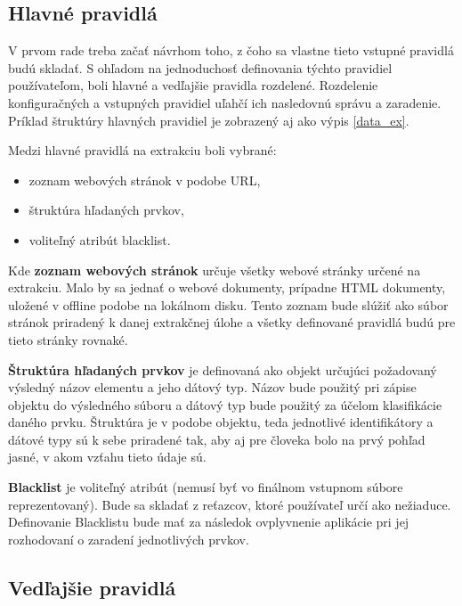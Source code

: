 \bigskip

\subsection{Hlavné pravidlá}

V prvom rade treba začať návrhom toho, z čoho sa vlastne tieto vstupné pravidlá budú skladať. S ohľadom na jednoduchosť definovania týchto pravidiel používateľom, boli hlavné a vedľajšie pravidla rozdelené. Rozdelenie konfiguračných a vstupných pravidiel uľahčí ich nasledovnú správu a zaradenie. Príklad štruktúry hlavných pravidiel je zobrazený aj ako výpis \ref{data_ex}.

Medzi hlavné pravidlá na extrakciu boli vybrané:
\begin{itemize}
    \item zoznam webových stránok v podobe URL,
    \item štruktúra hľadaných prvkov,
    \item voliteľný atribút blacklist.
\end{itemize}

\bigskip

Kde \textbf{zoznam webových stránok} určuje všetky webové stránky určené na extrakciu. Malo by sa jednať o webové dokumenty, prípadne HTML dokumenty, uložené v offline podobe na lokálnom disku. Tento zoznam bude slúžiť ako súbor stránok priradený k danej extrakčnej úlohe a všetky definované pravidlá budú pre tieto stránky rovnaké. 

\bigskip

\textbf{Štruktúra hľadaných prvkov} je definovaná ako objekt určujúci požadovaný výsledný názov elementu a jeho  dátový typ. Názov bude použitý pri zápise objektu do výsledného súboru a dátový typ bude použitý za účelom klasifikácie daného prvku. Štruktúra je v podobe objektu, teda jednotlivé identifikátory a dátové typy sú k sebe priradené tak, aby aj pre človeka bolo na prvý pohľad jasné, v akom vzťahu tieto údaje sú.

\bigskip

\textbf{Blacklist} je voliteľný atribút (nemusí byť vo finálnom vstupnom súbore reprezentovaný). Bude sa skladať z reťazcov, ktoré používateľ určí ako nežiaduce. Definovanie Blacklistu bude mať za následok ovplyvnenie aplikácie pri jej rozhodovaní o zaradení jednotlivých prvkov.


\subsection{Vedľajšie pravidlá}

